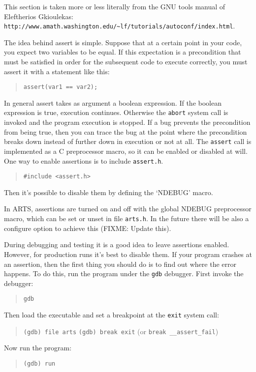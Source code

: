  \label{sec:development:assert}

This section is taken more or less literally from the GNU tools manual
of Eleftherios Gkioulekas:\\
\verb|http://www.amath.washington.edu/~lf/tutorials/autoconf/index.html|.

The idea behind assert is simple. Suppose that at a certain point in
your code, you expect two variables to be equal.  If this expectation
is a precondition that must be satisfied in order for the subsequent
code to execute correctly, you must assert it with a statement like
this:
\begin{quote}
\verb|assert(var1 == var2);|
\end{quote}

In general assert takes as argument a boolean expression. If the
boolean expression is true, execution continues. Otherwise the
\verb|abort| system call is invoked and the program execution is
stopped. If a bug prevents the precondition from being true, then you
can trace the bug at the point where the precondition breaks down
instead of further down in execution or not at all.  The \verb|assert| call
is implemented as a C preprocessor macro, so it can be enabled or
disabled at will. One way to enable assertions is to include
\verb|assert.h|.
\begin{quote}
  \verb|#include <assert.h>|
\end{quote}
Then it's possible to disable them by defining the `NDEBUG' macro.

In ARTS, assertions are turned on and off with the global NDEBUG
preprocessor macro, which can be set or unset in file
\verb|arts.h|. In the future there will be also a configure option to
achieve this (FIXME: Update this).

During debugging and testing it is a good idea to leave assertions
enabled. However, for production runs it's best to disable them. If
your program crashes at an assertion, then the first thing you should
do is to find out where the error happens. To do this, run the program
under the \verb|gdb| debugger. First invoke the debugger:
\begin{quote}
\verb|gdb|
\end{quote}
Then load the executable and set a breakpoint at the \verb|exit|
system call:
\begin{quote}
  \verb|(gdb) file arts|
  \verb|(gdb) break exit| (or \verb|break __assert_fail|)
\end{quote}
Now run the program: 
\begin{quote}
  \verb|(gdb) run|
\end{quote}

